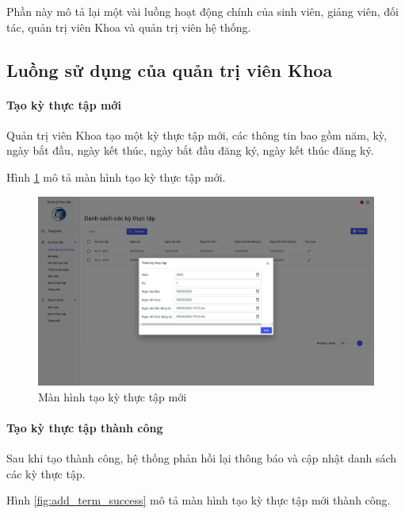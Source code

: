 \documentclass[./../main.tex]{subfiles}
\begin{document}
Phần này mô tả lại một vài luồng hoạt động chính của sinh viên, giảng viên, đối tác, quản trị viên Khoa và quản trị viên hệ thống.

\subsection{Luồng sử dụng của quản trị viên Khoa}

\paragraph*{Tạo kỳ thực tập mới}

Quản trị viên Khoa tạo một kỳ thực tập mới, các thông tin bao gồm năm, kỳ, ngày bắt đầu, ngày kết thúc, ngày bắt đầu đăng ký, ngày kết thúc đăng ký.

Hình \ref{fig:add_term_page} mô tả màn hình tạo kỳ thực tập mới.

\begin{figure}[]
	\includegraphics[width=\linewidth]{./images/image19.png}
	\caption{Màn hình tạo kỳ thực tập mới}
	\label{fig:add_term_page}
\end{figure}

\paragraph*{Tạo kỳ thực tập thành công}

Sau khi tạo thành công, hệ thống phản hồi lại thông báo và cập nhật danh sách các kỳ thực tập.

Hình \ref{fig:add_term_success} mô tả màn hình tạo kỳ thực tập mới thành công.
\end{document}
